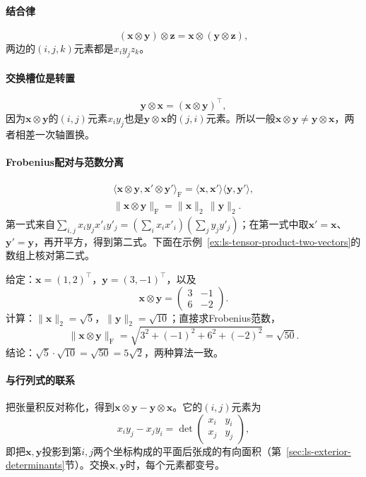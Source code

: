 \paragraph{结合律}
\[
 (\bm x\otimes\bm y)\otimes\bm z=\bm x\otimes(\bm y\otimes\bm z),
\]
两边的$(i,j,k)$元素都是$x_iy_jz_k$。

\paragraph{交换槽位是转置}
\[
 \bm y\otimes\bm x=(\bm x\otimes\bm y)^\top,
\]
因为$\bm x\otimes\bm y$的$(i,j)$元素$x_iy_j$也是$\bm y\otimes\bm x$的$(j,i)$元素。所以一般$\bm x\otimes\bm y\neq\bm y\otimes\bm x$，两者相差一次轴置换。

\paragraph{Frobenius配对与范数分离}
\[
 \begin{gathered}
\langle\bm x\otimes\bm y,\bm x'\otimes\bm y'\rangle_{\mathrm F}
 =\langle\bm x,\bm x'\rangle\langle\bm y,\bm y'\rangle,\\
\lVert\bm x\otimes\bm y\rVert_{\mathrm F}=\lVert\bm x\rVert_2\,\lVert\bm y\rVert_2.
 \end{gathered}
\]
第一式来自$\sum_{i,j}x_iy_jx'_iy'_j=(\sum_ix_ix'_i)(\sum_jy_jy'_j)$；在第一式中取$\bm x'=\bm x$、$\bm y'=\bm y$，再开平方，得到第二式。下面在示例~\ref{ex:ls-tensor-product-two-vectors}的数组上核对第二式。
\begin{example}[张量积范数的数值核对]
\label{ex:ls-tensor-product-norm-check}
给定：$\bm x=(1,2)^\top$，$\bm y=(3,-1)^\top$，以及
\[
 \bm x\otimes\bm y=\begin{pmatrix}3&-1\\6&-2\end{pmatrix}.
\]
计算：$\lVert\bm x\rVert_2=\sqrt5$，$\lVert\bm y\rVert_2=\sqrt{10}$；直接求Frobenius范数，
\[
 \lVert\bm x\otimes\bm y\rVert_{\mathrm F}=\sqrt{3^2+(-1)^2+6^2+(-2)^2}=\sqrt{50}.
\]
结论：$\sqrt5\cdot\sqrt{10}=\sqrt{50}=5\sqrt2$，两种算法一致。
\end{example}

\paragraph{与行列式的联系}
把张量积反对称化，得到$\bm x\otimes\bm y-\bm y\otimes\bm x$。它的$(i,j)$元素为
\[
 x_iy_j-x_jy_i=\det\begin{pmatrix}x_i&y_i\\x_j&y_j\end{pmatrix},
\]
即把$\bm x,\bm y$投影到第$i,j$两个坐标构成的平面后张成的有向面积（第~\ref{sec:ls-exterior-determinants}节）。交换$\bm x,\bm y$时，每个元素都变号。

